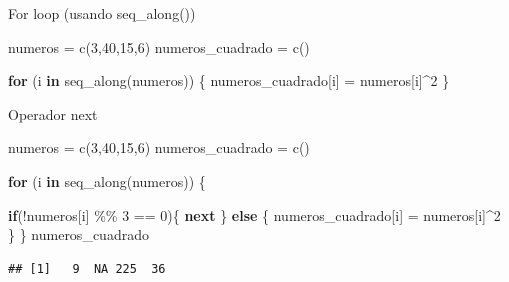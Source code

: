\documentclass[
  ignorenonframetext,
]{beamer}
\newenvironment{Shaded}{\begin{snugshade}}{\end{snugshade}}
\newcommand{\ControlFlowTok}[1]{\textcolor[rgb]{0.13,0.29,0.53}{\textbf{#1}}}
\newcommand{\DecValTok}[1]{\textcolor[rgb]{0.00,0.00,0.81}{#1}}
\newcommand{\FunctionTok}[1]{\textcolor[rgb]{0.00,0.00,0.00}{#1}}
\newcommand{\NormalTok}[1]{#1}
\newcommand{\OtherTok}[1]{\textcolor[rgb]{0.56,0.35,0.01}{#1}}
\newcommand{\SpecialCharTok}[1]{\textcolor[rgb]{0.00,0.00,0.00}{#1}}
\begin{document}
\begin{frame}[fragile]{For loop (usando seq\_along())}
\protect\hypertarget{for-loop-usando-seq_along}{}
\begin{Shaded}
\begin{Highlighting}[]
\NormalTok{numeros }\OtherTok{=} \FunctionTok{c}\NormalTok{(}\DecValTok{3}\NormalTok{,}\DecValTok{40}\NormalTok{,}\DecValTok{15}\NormalTok{,}\DecValTok{6}\NormalTok{)}
\NormalTok{numeros\_cuadrado }\OtherTok{=} \FunctionTok{c}\NormalTok{()}

\ControlFlowTok{for}\NormalTok{ (i }\ControlFlowTok{in} \FunctionTok{seq\_along}\NormalTok{(numeros)) \{}
\NormalTok{  numeros\_cuadrado[i] }\OtherTok{=}\NormalTok{ numeros[i]}\SpecialCharTok{\^{}}\DecValTok{2}
\NormalTok{\}}
\end{Highlighting}
\end{Shaded}
\end{frame}

\begin{frame}[fragile]{Operador next}
\protect\hypertarget{operador-next}{}
\begin{Shaded}
\begin{Highlighting}[]
\NormalTok{numeros }\OtherTok{=} \FunctionTok{c}\NormalTok{(}\DecValTok{3}\NormalTok{,}\DecValTok{40}\NormalTok{,}\DecValTok{15}\NormalTok{,}\DecValTok{6}\NormalTok{)}
\NormalTok{numeros\_cuadrado }\OtherTok{=} \FunctionTok{c}\NormalTok{()}

\ControlFlowTok{for}\NormalTok{ (i }\ControlFlowTok{in} \FunctionTok{seq\_along}\NormalTok{(numeros)) \{}
  
  \ControlFlowTok{if}\NormalTok{(}\SpecialCharTok{!}\NormalTok{numeros[i] }\SpecialCharTok{\%\%} \DecValTok{3} \SpecialCharTok{==} \DecValTok{0}\NormalTok{)\{}
    \ControlFlowTok{next}
\NormalTok{  \}}
  \ControlFlowTok{else}\NormalTok{ \{}
\NormalTok{  numeros\_cuadrado[i] }\OtherTok{=}\NormalTok{ numeros[i]}\SpecialCharTok{\^{}}\DecValTok{2}
\NormalTok{  \}}
\NormalTok{\}}
\NormalTok{numeros\_cuadrado}
\end{Highlighting}
\end{Shaded}

\begin{verbatim}
## [1]   9  NA 225  36
\end{verbatim}
\end{frame}
\end{document}
